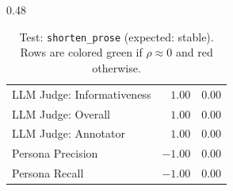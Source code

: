 \begin{table}[htbp]
\begin{subtable}[t]{0.48\textwidth}
\begin{tabular}{lrr}
\rowcolor{matchFalse} LLM Judge: Informativeness            &   $1.00$ &  0.00 \\
\rowcolor{matchFalse} LLM Judge: Overall                    &   $1.00$ &  0.00 \\
\rowcolor{matchFalse} LLM Judge: Annotator        &   $1.00$ &  0.00 \\
\rowcolor{matchFalse} Persona Precision                     &  $-1.00$ &  0.00 \\
\rowcolor{matchFalse} Persona Recall                        &  $-1.00$ &  0.00 \\
\bottomrule
\end{tabular}
\caption{LLM metrics}
\end{subtable}
\caption[Test: \texttt{shorten\_prose} (expected: stable).]{Test: \texttt{shorten\_prose} (expected: stable). Rows are colored green if $\rho\approx0$ and red otherwise.}
\label{tab:shorten_prose}
\end{table}